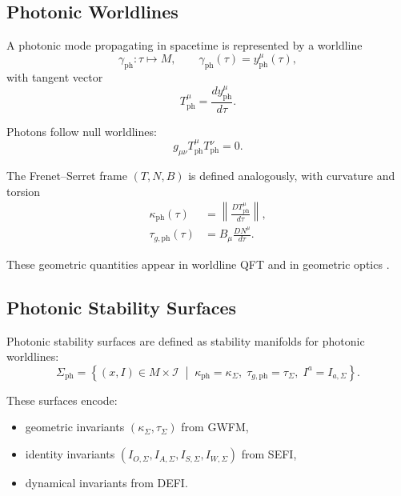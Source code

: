 \documentclass[aip,jmp,reprint,onecolumn,nofootinbib]{revtex4-2}
\begin{document}
\subsection{Photonic Worldlines}

A photonic mode propagating in spacetime is represented by a worldline
\begin{equation}
\gamma_{\mathrm{ph}} : \tau \mapsto M, \qquad
\gamma_{\mathrm{ph}}(\tau) = y^\mu_{\mathrm{ph}}(\tau),
\end{equation}
with tangent vector
\begin{equation}
T^\mu_{\mathrm{ph}} = \frac{dy^\mu_{\mathrm{ph}}}{d\tau}.
\end{equation}

Photons follow null worldlines:
\begin{equation}
g_{\mu\nu} T^\mu_{\mathrm{ph}} T^\nu_{\mathrm{ph}} = 0.
\end{equation}

The Frenet--Serret frame $(T,N,B)$ is defined analogously, with curvature and torsion
\begin{align}
\kappa_{\mathrm{ph}}(\tau) &= \left\| \frac{D T^\mu_{\mathrm{ph}}}{d\tau} \right\|, \\
\tau_{g,\mathrm{ph}}(\tau) &= B_\mu \frac{D N^\mu}{d\tau}.
\end{align}

These geometric quantities appear in worldline QFT \cite{Polyakov1987,Schubert2001} and 
in geometric optics \cite{BornWolf}.

\subsection{Photonic Stability Surfaces}

Photonic stability surfaces are defined as stability manifolds for photonic worldlines:
\begin{equation}
\Sigma_{\mathrm{ph}}
=
\left\{
(x,I) \in M \times \mathcal{I}
\;\middle|\;
\kappa_{\mathrm{ph}} = \kappa_{\Sigma},\;
\tau_{g,\mathrm{ph}} = \tau_{\Sigma},\;
I^a = I_{a,\Sigma}
\right\}.
\end{equation}

These surfaces encode:
\begin{itemize}
\item geometric invariants $(\kappa_{\Sigma},\tau_{\Sigma})$ from GWFM,
\item identity invariants $(I_{O,\Sigma},I_{A,\Sigma},I_{S,\Sigma},I_{W,\Sigma})$ from SEFI,
\item dynamical invariants from DEFI.
\end{itemize}
\end{document}
